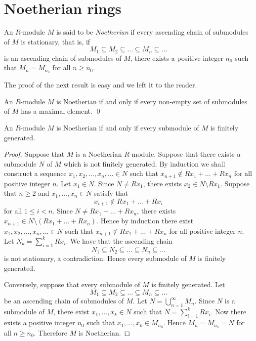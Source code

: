 \section{Noetherian rings}

An $R$-module $M$ is said to be \emph{Noetherian} if every ascending chain of submodules of $M$ is stationary, that is, if
$$M_1\subseteq M_2\subseteq\dots\subseteq M_n\subseteq\dots$$
is an ascending chain of submodules of $M$, there exists a positive integer $n_0$ such that $M_n=M_{n_0}$ for all $n\geq n_0$.

The proof of the next result is easy and we left it to the reader.

\begin{proposition}\label{prop: Noetherian1}
An $R$-module $M$ is Noetherian if and only if every non-empty set of submodules of $M$ has a maximal element. \qed
\end{proposition}

\begin{proposition}\label{prop:Noetherian2}
    An $R$-module $M$ is Noetherian if and only if every submodule of $M$ is finitely generated.
\end{proposition}

\begin{proof}
Suppose that $M$ is a Noetherian $R$-module. Suppose that there exists a submodule $N$ of $M$ which is not finitely generated. By induction we shall construct a sequence $x_1,x_2,\dots ,x_n,\dots\in N$ such that
$x_{n+1}\notin Rx_1+\dots +Rx_n$ for all positive integer $n$. Let $x_1\in N$. Since $N\neq Rx_1$, there exists $x_2\in N\setminus Rx_1$. Suppose that $n\geq 2$ and $x_1,\dots ,x_n\in N$ satisfy that
\[ x_{i+1}\notin Rx_1+\dots +Rx_i\]
for all $1\leq i<n$. Since $N\neq Rx_1+\dots +Rx_n$, there exists $x_{n+1}\in N\setminus (Rx_1+\dots +Rx_n)$. Hence by induction there exist $x_1,x_2,\dots ,x_n,\dots \in N$ such that $x_{n+1}\notin Rx_1+\dots +Rx_n$ for all positive integer $n$. Let $N_k=\sum_{i=1}^kRx_i$. We have that the ascending chain
\[N_1\subseteq N_2\subseteq\dots\subseteq N_n\subseteq\dots\]
is not stationary, a contradiction. Hence every submodule of $M$ is finitely generated.

Conversely, suppose that every submodule of $M$ is finitely generated. Let
\[M_1\subseteq M_2\subseteq\dots\subseteq M_n\subseteq\dots\]
be an ascending chain of submodules of $M$. Let $N=\bigcup_{n=1}^{\infty}M_n$. Since $N$ is a submodule of $M$, there exist $x_1,\dots ,x_k\in N$ such that $N=\sum_{i=1}^kRx_i$. Now there exists a positive integer $n_0$ such that $x_1,\dots ,x_k\in M_{n_0}$. Hence $M_n=M_{n_0}=N$ for all $n\geq n_0$. Therefore $M$ is Noetherian.
\end{proof}

